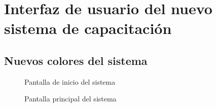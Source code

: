 {\chapter{Interfaz de usuario del nuevo sistema de capacitación}

\section{Nuevos colores del sistema}
\begin{figure}[H]
\centering
 \caption{Pantalla de inicio del sistema}
 \label{fig:login} 
\end{figure}

\begin{figure}[H]
\centering
 \caption{Pantalla principal del sistema}
 \label{fig:principal} 
\end{figure}

}
